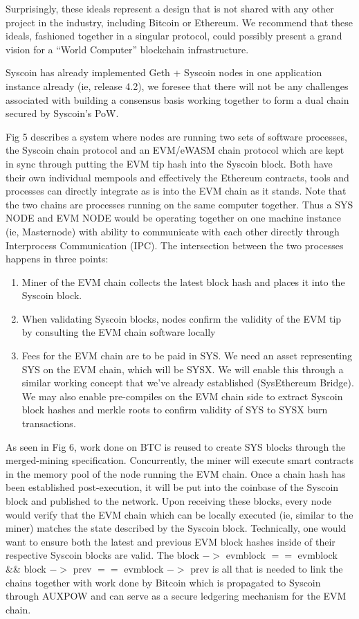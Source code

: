 \documentclass[peerreview]{ieeesyscoin}
\begin{document}
Surprisingly, these ideals represent a design that is not shared with any other project in the industry, including Bitcoin or Ethereum. We recommend that these ideals, fashioned together in a singular protocol, could possibly present a grand vision for a “World Computer” blockchain infrastructure.

Syscoin has already implemented Geth + Syscoin nodes in one application instance already (ie, release 4.2), we foresee that there will not be any challenges associated with building a consensus basis working together to form a dual chain secured by Syscoin’s PoW.

Fig 5 describes a system where nodes are running two sets of software processes, the Syscoin chain protocol and an EVM/eWASM chain protocol which are kept in sync through putting the EVM tip hash into the Syscoin block. Both have their own individual mempools and effectively the Ethereum contracts, tools and processes can directly integrate as is into the EVM chain as it stands. Note that the two chains are processes running on the same computer together. Thus a SYS NODE and EVM NODE would be operating together on one machine instance (ie, Masternode) with ability to communicate with each other directly through Interprocess Communication (IPC). The intersection between the two processes happens in three points:

\begin{enumerate}
\item Miner of the EVM chain collects the latest block hash and places it into the Syscoin block.
\item When validating Syscoin blocks, nodes confirm the validity of the EVM tip by consulting the EVM chain software locally
\item Fees for the EVM chain are to be paid in SYS. We need an asset representing SYS on the EVM chain, which will be SYSX. We will enable this through a similar working concept that we’ve already established (SysEthereum Bridge). We may also enable pre-compiles on the EVM chain side to extract Syscoin block hashes and merkle roots to confirm validity of SYS to SYSX burn transactions.
\end{enumerate}

As seen in Fig 6, work done on BTC is reused to create SYS blocks through the merged-mining specification. Concurrently, the miner will execute smart contracts in the memory pool of the node running the EVM chain. Once a chain hash has been established post-execution, it will be put into the coinbase of the Syscoin block and published to the network. Upon receiving these blocks, every node would verify that the EVM chain which can be locally executed (ie, similar to the miner) matches the state described by the Syscoin block. Technically, one would want to ensure both the latest and previous EVM block hashes inside of their respective Syscoin blocks are valid. The block $->$ evmblock $==$ evmblock \&\& block $->$ prev $==$ evmblock $->$ prev is all that is needed to link the chains together with work done by Bitcoin which is propagated to Syscoin through AUXPOW and can serve as a secure ledgering mechanism for the EVM chain.
\end{document}
